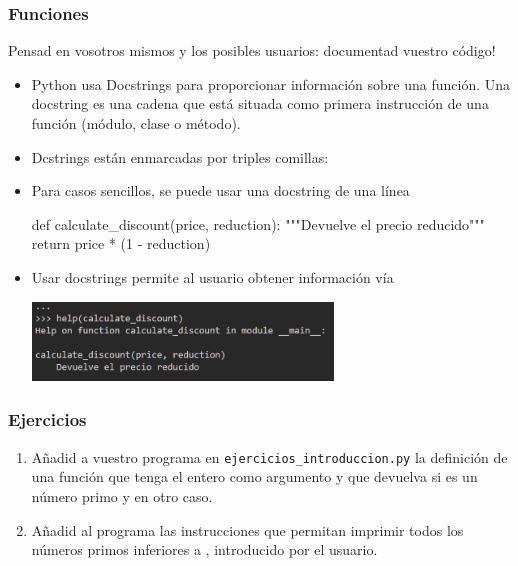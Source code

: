 \documentclass[handout,9pt]{beamer}
\begin{document}
\begin{frame}[fragile]
  \frametitle{Funciones}
  \begin{block}{}
    Pensad en vosotros mismos y los posibles usuarios: documentad
    vuestro código!
  \end{block}\pause
  \begin{itemize}
  \item<2->   Python usa  Docstrings para proporcionar información
    sobre una función. Una docstring es una cadena que está situada
    como primera instrucción de una función (módulo, clase o método).
\item<3-> Dcstrings están enmarcadas por triples comillas:
\item<4-> Para casos sencillos, se puede usar una docstring de una línea
  {\footnotesize
  \begin{pyverbatim}
def calculate_discount(price, reduction):
    """Devuelve el precio reducido"""
    return price * (1 - reduction)
  \end{pyverbatim}
  }
\item<5-> Usar docstrings permite al usuario obtener información vía
  \begin{center}
\includegraphics[width=8cm]{help_function_es}
\end{center}

\end{itemize}
\end{frame}

\begin{frame}[fragile]
  \frametitle{Ejercicios}
  \begin{enumerate}
  \item Añadid a vuestro programa en {\tt ejercicios\_introduccion.py}
    la definición de una función que tenga el entero  como
    argumento y que devuelva  si  es un número primo
    y   en otro caso.
  \item Añadid al programa las instrucciones que permitan imprimir
    todos los números primos inferiores a , introducido por el usuario.
  \end{enumerate}  
\end{frame}
\end{document}
